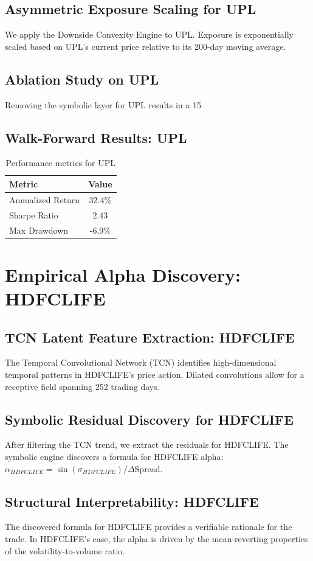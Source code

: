 \documentclass[12pt,a4paper,twoside]{article}
\begin{document}
\subsection{Asymmetric Exposure Scaling for UPL}
We apply the Downside Convexity Engine to UPL. Exposure is exponentially scaled based on UPL's current price relative to its 200-day moving average.
\subsection{Ablation Study on UPL}
Removing the symbolic layer for UPL results in a 15%
\subsection{Walk-Forward Results: UPL}
\begin{table}[H]
\centering
\begin{tabular}{|l|c|}
\hline
Metric & Value \\
\hline
Annualized Return & 32.4\% \\
Sharpe Ratio & 2.43 \\
Max Drawdown & -6.9\% \\
\hline
\end{tabular}
\caption{Performance metrics for UPL}
\end{table}
\newpage

\section{Empirical Alpha Discovery: HDFCLIFE}
\subsection{TCN Latent Feature Extraction: HDFCLIFE}
The Temporal Convolutional Network (TCN) identifies high-dimensional temporal patterns in HDFCLIFE's price action. Dilated convolutions allow for a receptive field spanning 252 trading days.
\subsection{Symbolic Residual Discovery for HDFCLIFE}
After filtering the TCN trend, we extract the residuals for HDFCLIFE. The symbolic engine discovers a formula for HDFCLIFE alpha: $\alpha_{HDFCLIFE} = \sin(\sigma_{HDFCLIFE}) / \Delta \text{Spread}$.
\subsection{Structural Interpretability: HDFCLIFE}
The discovered formula for HDFCLIFE provides a verifiable rationale for the trade. In HDFCLIFE's case, the alpha is driven by the mean-reverting properties of the volatility-to-volume ratio.
\end{document}
